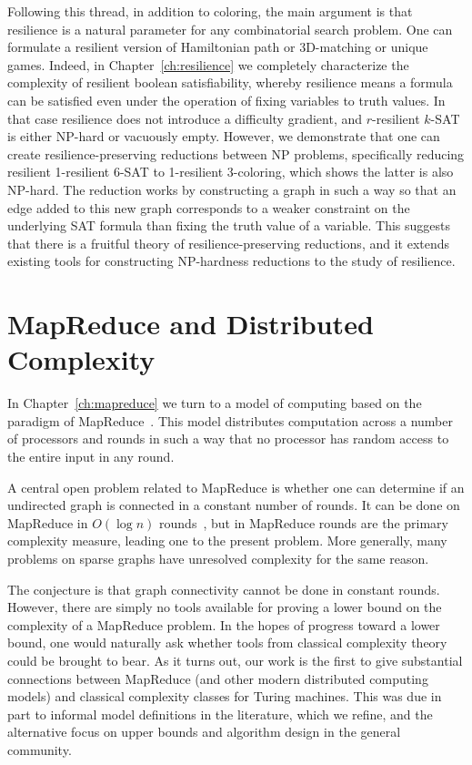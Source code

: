 Following this thread, in addition to coloring, the main argument is that
resilience is a natural parameter for any combinatorial search problem. One can
formulate a resilient version of Hamiltonian path or 3D-matching or unique
games. Indeed, in Chapter~\ref{ch:resilience} we completely characterize the
complexity of resilient boolean satisfiability, whereby resilience means a
formula can be satisfied even under the operation of fixing variables to truth
values. In that case resilience does not introduce a difficulty gradient, and
$r$-resilient $k$-SAT is either NP-hard or vacuously empty. However, we
demonstrate that one can create resilience-preserving reductions between NP
problems, specifically reducing resilient 1-resilient 6-SAT to 1-resilient
3-coloring, which shows the latter is also NP-hard. The reduction works by
constructing a graph in such a way so that an edge added to this new graph
corresponds to a weaker constraint on the underlying SAT formula than fixing
the truth value of a variable. This suggests that there is a fruitful theory of
resilience-preserving reductions, and it extends existing tools for
constructing NP-hardness reductions to the study of resilience.

\section{MapReduce and Distributed Complexity}

In Chapter~\ref{ch:mapreduce} we turn to a model of computing based on the
paradigm of MapReduce~\cite{DeanG08}. This model distributes computation
across a number of processors and rounds in such a way that no processor has
random access to the entire input in any round. 

A central open problem related to MapReduce is whether one can determine if an
undirected graph is connected in a constant number of rounds. It can be done on
MapReduce in $O(\log n)$ rounds~\cite{Karloff10}, but in MapReduce rounds are
the primary complexity measure, leading one to the present problem.  More
generally, many problems on sparse graphs have unresolved complexity for the
same reason.

The conjecture is that graph connectivity cannot be done in constant rounds.
However, there are simply no tools available for proving a lower bound on the
complexity of a MapReduce problem. In the hopes of progress toward a lower
bound, one would naturally ask whether tools from classical complexity theory
could be brought to bear. As it turns out, our work is the first to give
substantial connections between MapReduce (and other modern distributed
computing models) and classical complexity classes for Turing machines. This
was due in part to informal model definitions in the literature, which we
refine, and the alternative focus on upper bounds and algorithm design in the
general community.
 
